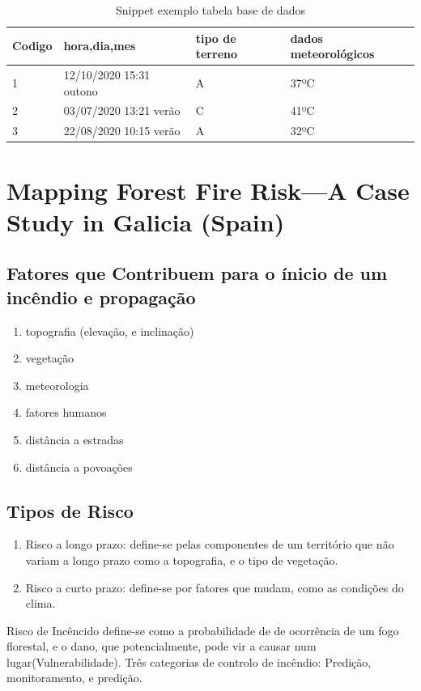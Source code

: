 \documentclass{article}
\begin{document}
\begin{table}[H]
\label{}
\begin{tabular}{|l|l|l|l|}
\hline
\cellcolor[HTML]{FFCCC9}Codigo & \cellcolor[HTML]{ECF4FF}hora,dia,mes & \cellcolor[HTML]{FFCE93}tipo de terreno & \cellcolor[HTML]{CBCEFB}dados meteorológicos \\ \hline
1                              & 12/10/2020 15:31 outono              & A                                       & 37ºC                                         \\ \hline
2                              & 03/07/2020 13:21 verão               & C                                       & 41ºC                                         \\ \hline
3                              & 22/08/2020 10:15 verão               & A                                       & 32ºC                                         \\ \hline
\end{tabular}
\caption{\label{tabela:exemplo_dataset}Snippet exemplo tabela base de dados}
\end{table}

\section{Mapping Forest Fire Risk—A Case Study in
Galicia (Spain) \cite{Novo2020MappingFF}}
\label{sec:Mapping Forest Fire Risk—A Case Study in Galicia}

\subsection{Fatores que Contribuem para o ínicio de um incêndio e propagação}
\begin{enumerate}
\item topografia (elevação, e inclinação)
\item vegetação
\item meteorologia
\item fatores humanos
\item distância a estradas
\item distância a povoações
\end{enumerate}

\subsection{Tipos de Risco}
\begin{enumerate}
\item Risco a longo prazo: define-se pelas componentes de um território que não variam a longo prazo como a topografia, e o tipo de vegetação.
\item Risco a curto prazo: define-se por fatores que mudam, como as condições do clima.
\end{enumerate}
Risco de Incêncido define-se como a probabilidade de de ocorrência de um fogo florestal, e o dano, que potencialmente, pode vir a causar num lugar(Vulnerabilidade).
Três categorias de controlo de incêndio: Predição, monitoramento, e predição.
\end{document}
